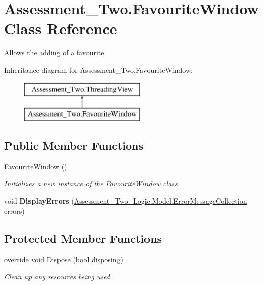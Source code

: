 \hypertarget{class_assessment___two_1_1_favourite_window}{
\section{Assessment\_\-Two.FavouriteWindow Class Reference}
\label{class_assessment___two_1_1_favourite_window}
}


Allows the adding of a favourite.  


Inheritance diagram for Assessment\_\-Two.FavouriteWindow:\begin{figure}[H]
\begin{center}
\leavevmode
\includegraphics[height=2.000000cm]{class_assessment___two_1_1_favourite_window}
\end{center}
\end{figure}
\subsection*{Public Member Functions}
\begin{DoxyCompactItemize}
\item 
\hyperlink{class_assessment___two_1_1_favourite_window_a0bcdb9aa29b4d1f230ded5c7046c7ace}{FavouriteWindow} ()
\begin{DoxyCompactList}\small\item\em Initializes a new instance of the \hyperlink{class_assessment___two_1_1_favourite_window}{FavouriteWindow} class. \item\end{DoxyCompactList}\item 
\hypertarget{class_assessment___two_1_1_favourite_window_a6c4cc7471254a0ce06107df3f1826335}{
void {\bfseries DisplayErrors} (\hyperlink{class_assessment___two___logic_1_1_model_1_1_error_message_collection}{Assessment\_\-Two\_\-Logic.Model.ErrorMessageCollection} errors)}
\label{class_assessment___two_1_1_favourite_window_a6c4cc7471254a0ce06107df3f1826335}

\end{DoxyCompactItemize}
\subsection*{Protected Member Functions}
\begin{DoxyCompactItemize}
\item 
override void \hyperlink{class_assessment___two_1_1_favourite_window_af10f08c71eea040501e37805158532b7}{Dispose} (bool disposing)
\begin{DoxyCompactList}\small\item\em Clean up any resources being used. \item\end{DoxyCompactList}\end{DoxyCompactItemize}
